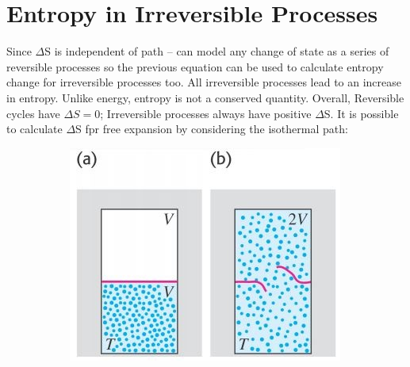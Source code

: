\documentclass[a4paper, 11pt, normalem]{report}
\begin{document}
\section{Entropy in Irreversible Processes}
Since $\Delta$S is independent of path -- can model any change of state as a series of reversible processes so the previous equation can be used to calculate entropy change for irreversible processes too.
All irreversible processes lead to an increase in entropy.
Unlike energy, entropy is not a conserved quantity.
Overall, Reversible cycles have ${\Delta}S = 0$; Irreversible processes always have positive $\Delta$S.
It is possible to calculate $\Delta$S fpr free expansion by considering the isothermal path:
\begin{figure}[H]
    \centering
	\begin{subfigure}{0.4\textwidth}
		\includegraphics[width=\textwidth]{Entropy1.jpg}
	\end{subfigure}
	~
	\begin{subfigure}{0.3\textwidth}

\end{subfigure}
\end{figure}
\end{document}
